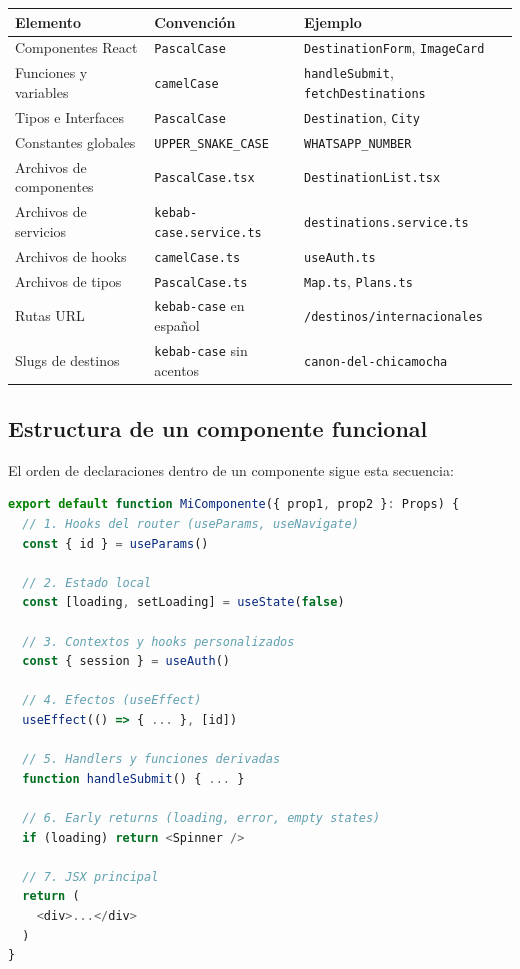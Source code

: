 \documentclass[12pt,letterpaper]{article}
\newcommand{\code}[1]{\texttt{#1}}
\begin{document}
\begin{longtable}{p{} p{} p{}}
\toprule
\textbf{Elemento} & \textbf{Convención} & \textbf{Ejemplo} \\
\midrule
Componentes React & \code{PascalCase} & \code{DestinationForm}, \code{ImageCard} \\
Funciones y variables & \code{camelCase} & \code{handleSubmit}, \code{fetchDestinations} \\
Tipos e Interfaces & \code{PascalCase} & \code{Destination}, \code{City} \\
Constantes globales & \code{UPPER\_SNAKE\_CASE} & \code{WHATSAPP\_NUMBER} \\
Archivos de componentes & \code{PascalCase.tsx} & \code{DestinationList.tsx} \\
Archivos de servicios & \code{kebab-case.service.ts} & \code{destinations.service.ts} \\
Archivos de hooks & \code{camelCase.ts} & \code{useAuth.ts} \\
Archivos de tipos & \code{PascalCase.ts} & \code{Map.ts}, \code{Plans.ts} \\
Rutas URL & \code{kebab-case} en español & \code{/destinos/internacionales} \\
Slugs de destinos & \code{kebab-case} sin acentos & \code{canon-del-chicamocha} \\
\bottomrule
\end{longtable}

\subsection{Estructura de un componente funcional}

El orden de declaraciones dentro de un componente sigue esta secuencia:

\begin{lstlisting}[language=typescript]
export default function MiComponente({ prop1, prop2 }: Props) {
  // 1. Hooks del router (useParams, useNavigate)
  const { id } = useParams()

  // 2. Estado local
  const [loading, setLoading] = useState(false)

  // 3. Contextos y hooks personalizados
  const { session } = useAuth()

  // 4. Efectos (useEffect)
  useEffect(() => { ... }, [id])

  // 5. Handlers y funciones derivadas
  function handleSubmit() { ... }

  // 6. Early returns (loading, error, empty states)
  if (loading) return <Spinner />

  // 7. JSX principal
  return (
    <div>...</div>
  )
}
\end{lstlisting}
\end{document}
